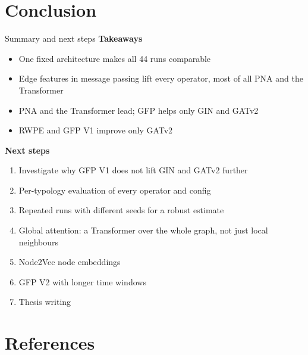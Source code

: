 \documentclass[aspectratio=169,10pt,t]{beamer}
\begin{document}
\section{Conclusion}

\begin{frame}{Summary and next steps}
  \textbf{Takeaways}
  \begin{itemize}
    \item One fixed architecture makes all 44 runs comparable
    \item Edge features in message passing lift every operator, most of all PNA and the Transformer
    \item PNA and the Transformer lead; GFP helps only GIN and GATv2
    \item RWPE and GFP V1 improve only GATv2
  \end{itemize}
  \vspace{0.6em}
  \textbf{Next steps}
  \begin{enumerate}
    \item Investigate why GFP V1 does not lift GIN and GATv2 further
    \item Per-typology evaluation of every operator and config
    \item Repeated runs with different seeds for a robust estimate
    \item Global attention: a Transformer over the whole graph, not just local neighbours
    \item Node2Vec node embeddings
    \item GFP V2 with longer time windows
    \item Thesis writing
  \end{enumerate}
\end{frame}

\section{References}
\end{document}
